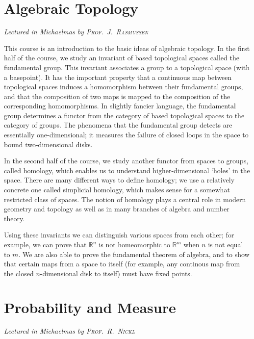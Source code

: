 \newcommand{\volname}{Part II}


\chapter[Algebraic Topology \\ \textnormal{\emph{Lectured in Michaelmas \oldstylenums{2022} by \textsc{Prof.\ J.\ Rasmussen}}}]{Algebraic Topology}
\emph{\Large Lectured in Michaelmas  by \textsc{Prof.\ J.\ Rasmussen}}

This course is an introduction to the basic ideas of algebraic topology.
In the first half of the course, we study an invariant of based topological spaces called the fundamental group.
This invariant associates a group to a topological space (with a basepoint).
It has the important property that a continuous map between topological spaces induces a homomorphism between their fundamental groups, and that the composition of two maps is mapped to the composition of the corresponding homomorphisms.
In slightly fancier language, the fundamental group determines a functor from the category of based topological spaces to the category of groups.
The phenomena that the fundamental group detects are essentially one-dimensional; it measures the failure of closed loops in the space to bound two-dimensional disks.

In the second half of the course, we study another functor from spaces to groups, called homology, which enables us to understand higher-dimensional `holes' in the space.
There are many different ways to define homology; we use a relatively concrete one called simplicial homology, which makes sense for a somewhat restricted class of spaces.
The notion of homology plays a central role in modern geometry and topology as well as in many branches of algebra and number theory.

Using these invariants we can distinguish various spaces from each other; for example, we can prove that \( \mathbb R^n \) is not homeomorphic to \( \mathbb R^m \) when \( n \) is not equal to \( m \).
We are also able to prove the fundamental theorem of algebra, and to show that certain maps from a space to itself (for example, any continous map from the closed \( n \)-dimensional disk to itself) must have fixed points.



\chapter[Probability and Measure \\ \textnormal{\emph{Lectured in Michaelmas \oldstylenums{2022} by \textsc{Prof.\ R.\ Nickl}}}]{Probability and Measure}
\emph{\Large Lectured in Michaelmas  by \textsc{Prof.\ R.\ Nickl}}

